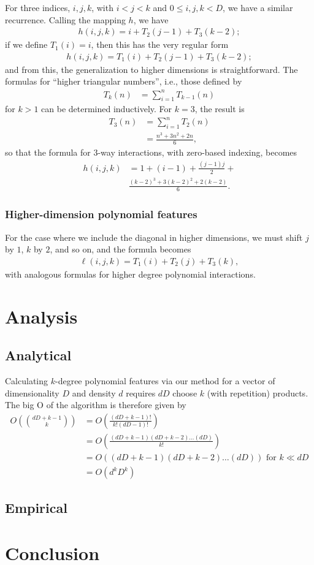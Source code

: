 \documentclass{article} %
\begin{document}
For three indices, $i,j,k$, with $i < j < k$ and $0 \le i,j,k < D$, we have a similar recurrence. Calling the mapping $h$, we have 
\begin{align}
h(i,j,k) = i + T_2(j-1) + T_3(k-2);
\end{align}
if we define $T_1(i) = i$, then this has the very regular form
\begin{align}
h(i,j,k) =  T_1(i) + T_2(j-1) + T_3(k-2);
\end{align}
and from this, the generalization to higher dimensions is straightforward. The formulas for ``higher triangular numbers'', i.e., those defined by
\begin{align}
T_k(n) &= \sum_{i=1}^n T_{k-1}(n)
\end{align}
for $k > 1$ can be determined inductively. For $k = 3$, the result is 
\begin{align}
T_3(n) &= \sum_{i=1}^n T_{2}(n)\\
&= \frac{n^3 + 3n^2 + 2n}{6},
\end{align}
so that the formula for 3-way interactions, with zero-based indexing, becomes 
\begin{align}
h(i, j, k) &= 1 + (i-1) + \frac{(j-1)j}{2} + \\
& \frac{(k-2)^3 + 3(k-2)^2 + 2(k-2)}{6}. 
\end{align}
\subsubsection{Higher-dimension polynomial features}
For the case where we include the diagonal in higher dimensions, we must shift $j$ by $1$, $k$ by $2$, and so on, and the formula becomes
\begin{align}
\ell(i,j,k) =  T_1(i) + T_2(j) + T_3(k),
\end{align}
with analogous formulas for higher degree polynomial interactions. 

\section{Analysis}
\subsection{Analytical}

Calculating $k$-degree polynomial features via our method for a vector of dimensionality $D$ and density $d$ requires $dD$ choose $k$ (with repetition) products.
The big O of the algorithm is therefore given by
\begin{align}
O\left(\binom{dD+k-1}{k}\right) & = O\left(\frac{(dD+k-1)!}{k!(dD-1)!}\right)\\
& = O\left(\frac{(dD+k-1)(dD+k-2) \dots (dD)}{k!}\right)\\
& = O\left((dD+k-1)(dD+k-2) \dots (dD)\right) \mbox{ for } k \ll dD\\
& = O\left(d^kD^k\right)
\end{align}

\subsection{Empirical}
\section{Conclusion}




\end{document}
